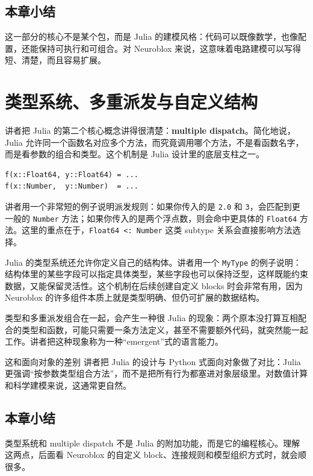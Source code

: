 \documentclass[a4paper]{article}
\begin{document}
\subsection{本章小结}
这一部分的核心不是某个包，而是 Julia 的建模风格：代码可以既像数学，也像配置，还能保持可执行和可组合。对 Neuroblox 来说，这意味着电路建模可以写得短、清楚，而且容易扩展。

\section{类型系统、多重派发与自定义结构}
讲者把 Julia 的第二个核心概念讲得很清楚：\textbf{multiple dispatch}。简化地说，Julia 允许同一个函数名对应多个方法，而究竟调用哪个方法，不是看函数名字，而是看参数的组合和类型。这个机制是 Julia 设计里的底层支柱之一。

\begin{lstlisting}
f(x::Float64, y::Float64) = ...
f(x::Number,  y::Number)  = ...
\end{lstlisting}

讲者用一个非常短的例子说明派发规则：如果你传入的是 \texttt{2.0} 和 \texttt{3}，会匹配到更一般的 \texttt{Number} 方法；如果你传入的是两个浮点数，则会命中更具体的 \texttt{Float64} 方法。这里的重点在于，\texttt{Float64 <: Number} 这类 subtype 关系会直接影响方法选择。

Julia 的类型系统还允许你定义自己的结构体。讲者用一个 \texttt{MyType} 的例子说明：结构体里的某些字段可以指定具体类型，某些字段也可以保持泛型，这样既能约束数据，又能保留灵活性。这个机制在后续创建自定义 blocks 时会非常有用，因为 Neuroblox 的许多组件本质上就是类型明确、但仍可扩展的数据结构。

类型和多重派发组合在一起，会产生一种很 Julia 的现象：两个原本没打算互相配合的类型和函数，可能只需要一条方法定义，甚至不需要额外代码，就突然能一起工作。讲者把这种现象称为一种“emergent”式的语言能力。

\begin{importantbox}{这和面向对象的差别}
讲者把 Julia 的设计与 Python 式面向对象做了对比：Julia 更强调“按参数类型组合方法”，而不是把所有行为都塞进对象层级里。对数值计算和科学建模来说，这通常更自然。
\end{importantbox}

\subsection{本章小结}
类型系统和 multiple dispatch 不是 Julia 的附加功能，而是它的编程核心。理解这两点，后面看 Neuroblox 的自定义 block、连接规则和模型组织方式时，就会顺很多。
\end{document}
